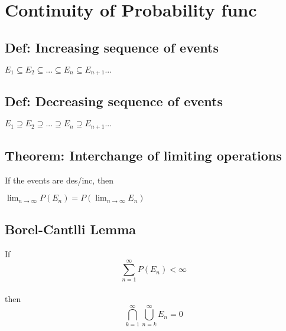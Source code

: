 \section{Continuity of Probability func}
    \subsection*{Def: Increasing sequence of events}
        $E_1 \subseteq E_2 \subseteq ... \subseteq E_n \subseteq E_{n+1} ...$
    \subsection*{Def: Decreasing sequence of events}
        $E_1 \supseteq E_2 \supseteq ... \supseteq E_n \supseteq E_{n+1} ...$
    \subsection*{Theorem: Interchange of limiting operations}
        If the events are des/inc, then

        $\lim_{n \to \infty} P(E_n) = P(\lim_{n \to \infty} E_n)$

    \subsection*{Borel-Cantlli Lemma}
        If \[\sum_{n=1}^{\infty} P(E_n) < \infty\]\\
        then \[\bigcap_{k=1}^{\infty} \bigcup_{n=k}^{\infty} E_n = 0\]\\
        
